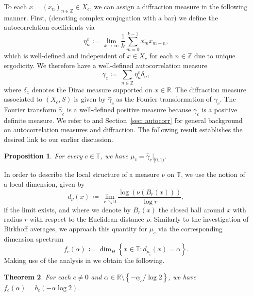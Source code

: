 \documentclass[11pt,reqno]{amsart}
\theoremstyle{plain}
\newtheorem{theorem}{Theorem}[section]
\newtheorem{prop}[theorem]{Proposition}
\theoremstyle{definition}
\newcommand{\birk}{b}
\newcommand{\Z}{{\mathbb Z}}
\newcommand{\R}{{\mathbb R}}
\newcommand{\TT}{\mathbb{T}}
\begin{document}
To each $x = (x_n)_{n \in \Z} \in X_c$, we can assign a diffraction measure in the following manner. 
First, (denoting complex conjugation with a bar) we define the autocorrelation coefficients via
\begin{equation}\label{eq: autocorr coeff}
 \eta^c_n\, \coloneqq\, \lim_{k \to \infty} \frac{1}{k} \sum_{m = 0}^{k-1} \overline{x_m} x_{m+n},
\end{equation}
which is well-defined and independent of $x \in X_c$ for each $n \in \Z$ due to unique ergodicity. We therefore have a well-defined autocorrelation measure
\begin{equation*}%
 \gamma_c\, \coloneqq\, \sum_{n \in \Z} \eta^c_n \delta_n,
\end{equation*}
where $\delta_x$ denotes the Dirac measure supported on $x\in \R$. 
The diffraction measure associated to $(X_c,S)$ is given by $\widehat{\gamma}_c$ as the Fourier transformation of $\gamma_c$. The Fourier transform $\widehat{\gamma}_c$ is a well-defined positive measure because $\gamma_c$ is a positive definite measure.
We refer to \cite{baake} and Section~\ref{sec: autocorr} for general background on autocorrelation measures and diffraction. 
The following result establishes the desired link to our earlier discussion.

\begin{prop}
For every $c \in \TT$, we have $\mu_c = \widehat{\gamma}_c\vert_{[0,1)}$. 
\end{prop}

In order to describe the local structure of a measure $\nu$ on $\TT$, we use the notion of a local dimension, given by
\[
d_{\nu}(x)\, \coloneqq\, \lim_{r \searrow 0} \frac{\log(\nu( B_r(x)))}{\log r},
\]
 if the limit exists, and where we denote by $B_r(x)$ the closed ball around $x$ with radius $r$ with respect to the Euclidean distance $\rho$. 
Similarly to the investigation of Birkhoff averages, we approach this quantity for $\mu_c$ via the corresponding dimension spectrum
\[
f_c(\alpha)\,\coloneqq\, \dim_H \left\{ x \in \TT : d_{\mu_c}(x) = \alpha \right\}.
\]
Making use of the analysis in \cite{fan_generalized_2020} we obtain the following.

\begin{theorem}\label{thm: dim spectrum}
For each $c \neq 0$ and $\alpha \in \R \setminus \left\{ -\underline{\alpha}_c/\log 2 \right\}$, we have $f_c(\alpha) =  \birk_c( - \alpha \log 2)$.
\end{theorem}
\end{document}
